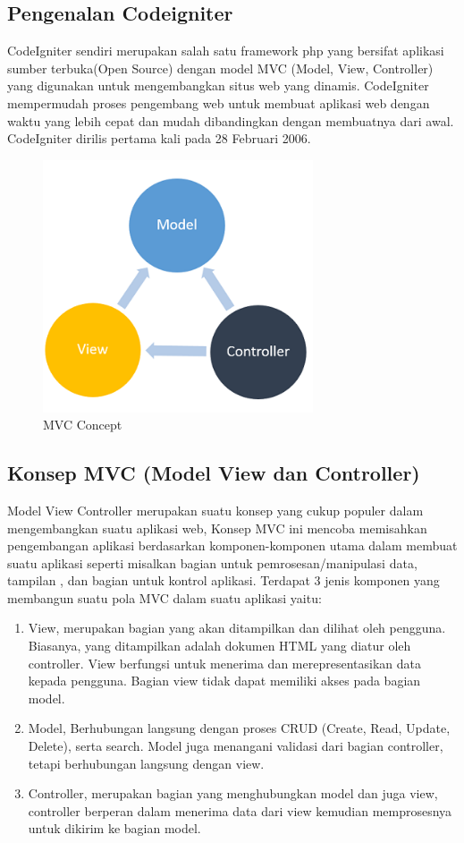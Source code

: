 \subsection{Pengenalan Codeigniter}

CodeIgniter sendiri merupakan salah satu framework php yang bersifat aplikasi sumber terbuka(Open Source) dengan model MVC (Model, View, Controller) yang digunakan untuk mengembangkan situs web yang dinamis. CodeIgniter mempermudah proses pengembang web untuk membuat aplikasi web dengan waktu yang lebih cepat dan mudah dibandingkan dengan membuatnya dari awal. CodeIgniter dirilis pertama kali pada 28 Februari 2006. 

	\begin{figure}[H]
		\includegraphics[width=8cm]{figures/web/mvc.png}
		\centering
		\caption{MVC Concept}
	\end{figure}
\subsection{Konsep MVC (Model View dan Controller)}
Model View Controller merupakan suatu konsep yang cukup populer dalam mengembangkan suatu aplikasi web, Konsep MVC ini mencoba memisahkan pengembangan aplikasi berdasarkan komponen-komponen utama dalam membuat suatu aplikasi seperti misalkan bagian untuk pemrosesan/manipulasi data, tampilan , dan bagian untuk kontrol aplikasi. Terdapat 3 jenis komponen yang membangun suatu pola MVC dalam suatu aplikasi yaitu: 
\begin{enumerate}
	\item View, merupakan bagian yang akan ditampilkan dan dilihat oleh pengguna. Biasanya, yang ditampilkan adalah dokumen HTML yang diatur oleh controller. View berfungsi untuk menerima dan merepresentasikan data kepada pengguna. Bagian view tidak dapat memiliki akses pada bagian model.
	\item Model, Berhubungan langsung dengan proses CRUD (Create, Read, Update, Delete), serta search. Model juga menangani validasi dari bagian controller, tetapi berhubungan langsung dengan view.
	\item Controller, merupakan bagian yang menghubungkan model dan juga view, controller berperan dalam menerima data dari view kemudian memprosesnya untuk dikirim ke bagian model.
\end{enumerate}

